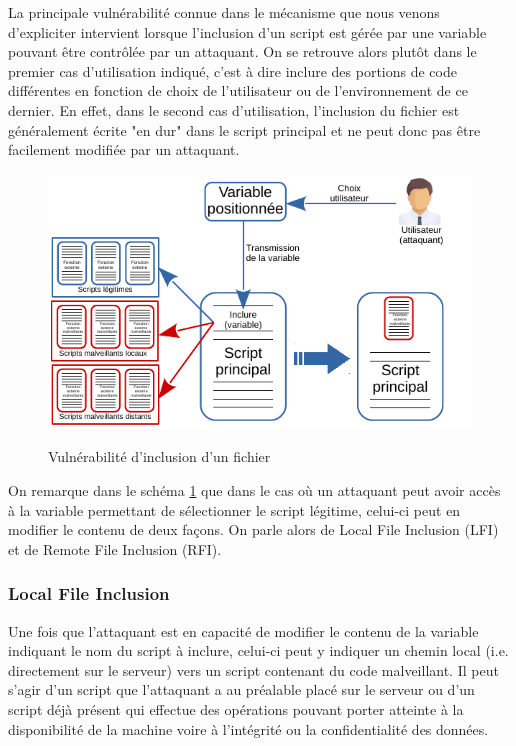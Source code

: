 La principale vulnérabilité connue dans le mécanisme que nous venons d'expliciter intervient lorsque l'inclusion d'un script est gérée par une variable pouvant être contrôlée par un attaquant. On se retrouve alors plutôt dans le premier cas d'utilisation indiqué, c'est à dire inclure des portions de code différentes en fonction de choix de l'utilisateur ou de l'environnement de ce dernier. En effet, dans le second cas d'utilisation, l'inclusion du fichier est généralement écrite "en dur" dans le script principal et ne peut donc pas être facilement modifiée par un attaquant.

\begin{figure}[!h]
\begin{center}

\label{inclusion_hacked}
\includegraphics[scale=1.4]{images/include_hacked.pdf}

\caption{Vulnérabilité d'inclusion d'un fichier}

\end{center}
\end{figure}

On remarque dans le schéma \ref{inclusion_hacked} que dans le cas où un attaquant peut avoir accès à la variable permettant de sélectionner le script légitime, celui-ci peut en modifier le contenu de deux façons. On parle alors de Local File Inclusion (LFI) et de Remote File Inclusion (RFI).

\subsubsection{Local File Inclusion}

Une fois que l'attaquant est en capacité de modifier le contenu de la variable indiquant le nom du script à inclure, celui-ci peut y indiquer un chemin local (i.e. directement sur le serveur) vers un script contenant du code malveillant. Il peut s'agir d'un script que l'attaquant a au préalable placé sur le serveur ou d'un script déjà présent qui effectue des opérations pouvant porter atteinte à la disponibilité de la machine voire à l'intégrité ou la confidentialité des données.

